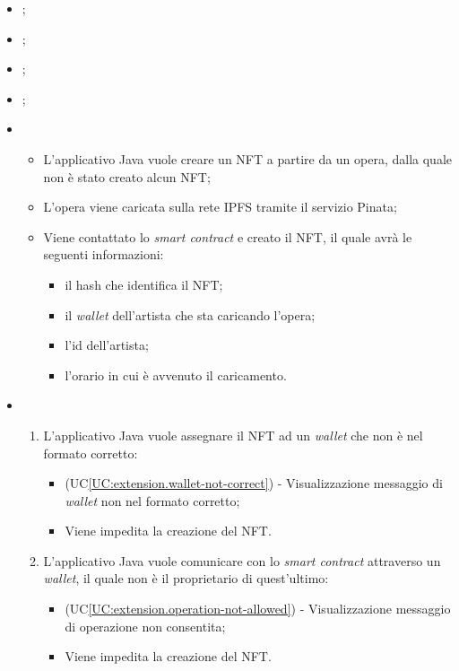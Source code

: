 \begin{itemize}
  \item {};
  \item {};
  \item {};
  \item {};
  \item \UCMain
  \begin{itemize}
    \item L'applicativo Java vuole creare un NFT a partire da un opera, dalla quale non è stato creato alcun NFT;
    \item L'opera viene caricata sulla rete IPFS tramite il servizio Pinata;
    \item Viene contattato lo \textit{smart contract} e creato il NFT, il quale avrà le seguenti informazioni:
    \begin{itemize}
      \item il hash che identifica il NFT;
      \item il \textit{wallet} dell'artista che sta caricando l'opera;
      \item l'id dell'artista;
      \item l'orario in cui è avvenuto il caricamento.
    \end{itemize}
  \end{itemize}
  \item \UCExt
  \begin{enumerate}[label=\lett]
    \item L'applicativo Java vuole assegnare il NFT ad un \textit{wallet} che non è nel formato corretto:
    \begin{itemize}
      \item (UC\ref{UC:extension.wallet-not-correct}) - Visualizzazione messaggio di \textit{wallet} non nel formato corretto;
      \item Viene impedita la creazione del NFT.
    \end{itemize}

    \item L'applicativo Java vuole comunicare con lo \textit{smart contract} attraverso un \textit{wallet}, il quale non è il proprietario di quest'ultimo:
    \begin{itemize}
      \item (UC\ref{UC:extension.operation-not-allowed}) - Visualizzazione messaggio di operazione non consentita;
      \item Viene impedita la creazione del NFT.
    \end{itemize}


\end{enumerate}
\end{itemize}

